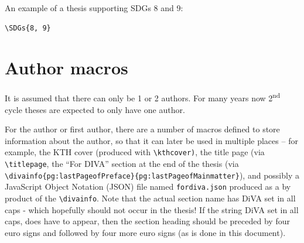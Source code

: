 \documentclass[examplethesis.tex]{subfiles}
\begin{document}
An example of a thesis supporting SDGs 8 and 9:
\begin{lstlisting}[style=latexExampleForAuthors]
\SDGs{8, 9}
\end{lstlisting}


\FloatBarrier

\section{Author macros}
\label{sec:authorMacros}
It is assumed that there can only be 1 or 2 authors. For many years now 2\textsuperscript{nd} cycle theses are expected to only have one author.

For the author or first author, there are a number of macros defined to store information about the author, so that it can later be used in multiple places -- for example, the KTH cover (produced with \texttt{\textbackslash kthcover)}, the title page (via \texttt{\textbackslash titlepage}, the ``For DIVA'' section at the end of the thesis (via
\texttt{\footnotesize\textbackslash divainfo\{pg:lastPageofPreface\}\{pg:lastPageofMainmatter\}}), and possibly a JavaScript Object Notation (JSON) file named \texttt{fordiva.json} produced as a by product of the \texttt{\textbackslash divainfo}. Note that the actual section name has DiVA set in all caps - which hopefully should not occur in the thesis! If the string DiVA set in all caps, does have to appear, then the section heading should be preceded by four euro signs and followed by four more euro signs (as is done in this document).
\end{document}
